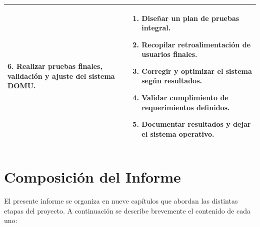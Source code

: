 \begin{longtable}{|p{}|p{}|}
6. Realizar pruebas finales, validación y ajuste del sistema DOMU. &
\begin{enumerate}
    \item Diseñar un plan de pruebas integral.
    \item Recopilar retroalimentación de usuarios finales.
    \item Corregir y optimizar el sistema según resultados.
    \item Validar cumplimiento de requerimientos definidos.
    \item Documentar resultados y dejar el sistema operativo.
\end{enumerate}
\\ \hline

\end{longtable}

\section{Composición del Informe}
El presente informe se organiza en nueve capítulos que abordan las distintas etapas del proyecto. A continuación se describe brevemente el contenido de cada uno:

